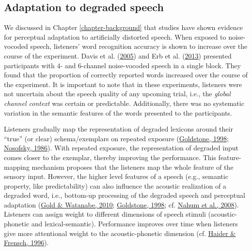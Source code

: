 \documentclass[a4paper, nobind]{templates/ociamthesis}
\begin{document}
\hypertarget{adaptation-to-degraded-speech}{%
\subsection{Adaptation to degraded speech}\label{adaptation-to-degraded-speech}}

We discussed in Chapter \ref{chapter-background} that studies have shown evidence for perceptual adaptation to artificially distorted speech.
When exposed to noise-vocoded speech, listeners' word recognition accuracy is shown to increase over the course of the experiment.
Davis et al. (\protect\hyperlink{ref-Davis2005}{2005}) and Erb et al. (\protect\hyperlink{ref-Erb2013}{2013}) presented participants with 4- and 6-channel noise-vocoded speech in a single block.
They found that the proportion of correctly reported words increased over the course of the experiment.
It is important to note that in these experiments, listeners were not uncertain about the speech quality of any upcoming trial,
i.e., the \emph{global channel context} was certain or predictable.
Additionally, there was no systematic variation in the semantic features of the words presented to the participants.

Listeners gradually map the representation of degraded lexicons around their ``true'' (or clear) schema/exemplars on repeated exposure (\protect\hyperlink{ref-Goldstone1998}{Goldstone, 1998}; \protect\hyperlink{ref-Nosofsky1986}{Nosofsky, 1986}).
With repeated exposure, the representation of degraded input comes closer to the exemplar, thereby improving the performance.
This feature-mapping mechanism proposes that the listeners map the whole feature of the sensory input.
However, the higher level features of a speech (e.g., semantic property, like predictability) can also influence the acoustic realization of a degraded word,
i.e., bottom-up processing of the degraded speech and perceptual adaptation (\protect\hyperlink{ref-Gold2010}{Gold \& Watanabe, 2010}; \protect\hyperlink{ref-Goldstone1998}{Goldstone, 1998}; cf. \protect\hyperlink{ref-Nahum2008}{Nahum et al., 2008}).
Listeners can assign weight to different dimensions of speech stimuli (acoustic-phonetic and lexical-semantic).
Performance improves over time when listeners give more attentional weight to the acoustic-phonetic dimension (cf. \protect\hyperlink{ref-Haider1996}{Haider \& Frensch, 1996}).
\end{document}
